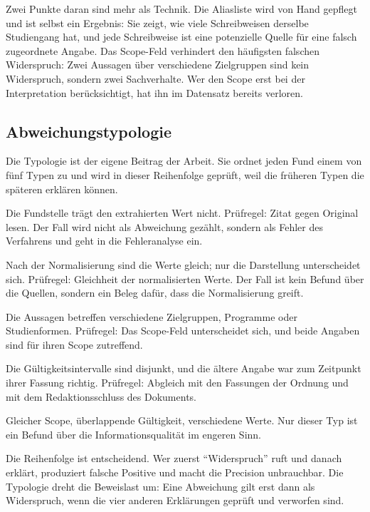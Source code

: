 Zwei Punkte daran sind mehr als Technik. Die Aliasliste wird von Hand gepflegt und ist selbst
ein Ergebnis: Sie zeigt, wie viele Schreibweisen derselbe Studiengang hat, und jede
Schreibweise ist eine potenzielle Quelle für eine falsch zugeordnete Angabe. Das Scope-Feld
verhindert den häufigsten falschen Widerspruch: Zwei Aussagen über verschiedene Zielgruppen
sind kein Widerspruch, sondern zwei Sachverhalte. Wer den Scope erst bei der Interpretation
berücksichtigt, hat ihn im Datensatz bereits verloren.

\subsection{Abweichungstypologie}
\label{sec:typologie}

Die Typologie ist der eigene Beitrag der Arbeit. Sie ordnet jeden Fund einem von fünf Typen
zu und wird in dieser Reihenfolge geprüft, weil die früheren Typen die späteren erklären
können.

\begin{description}[style=nextline]
  \item[Extraktionsfehler]
  Die Fundstelle trägt den extrahierten Wert nicht. Prüfregel: Zitat gegen Original lesen.
  Der Fall wird nicht als Abweichung gezählt, sondern als Fehler des Verfahrens und geht in
  die Fehleranalyse ein.
  \item[Formulierungsunterschied]
  Nach der Normalisierung sind die Werte gleich; nur die Darstellung unterscheidet sich.
  Prüfregel: Gleichheit der normalisierten Werte. Der Fall ist kein Befund über die Quellen,
  sondern ein Beleg dafür, dass die Normalisierung greift.
  \item[Scope-Unterschied]
  Die Aussagen betreffen verschiedene Zielgruppen, Programme oder Studienformen. Prüfregel:
  Das Scope-Feld unterscheidet sich, und beide Angaben sind für ihren Scope zutreffend.
  \item[Versionsunterschied]
  Die Gültigkeitsintervalle sind disjunkt, und die ältere Angabe war zum Zeitpunkt ihrer
  Fassung richtig. Prüfregel: Abgleich mit den Fassungen der Ordnung und mit dem
  Redaktionsschluss des Dokuments.
  \item[Echter Widerspruch]
  Gleicher Scope, überlappende Gültigkeit, verschiedene Werte. Nur dieser Typ ist ein Befund
  über die Informationsqualität im engeren Sinn.
\end{description}

Die Reihenfolge ist entscheidend. Wer zuerst \enquote{Widerspruch} ruft und danach erklärt,
produziert falsche Positive und macht die Precision unbrauchbar. Die Typologie dreht die
Beweislast um: Eine Abweichung gilt erst dann als Widerspruch, wenn die vier anderen
Erklärungen geprüft und verworfen sind.

